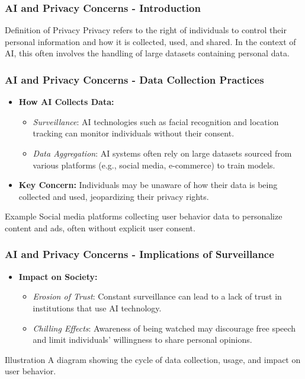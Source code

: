 \documentclass[aspectratio=169]{beamer}
\begin{document}
\begin{frame}[fragile]
    \frametitle{AI and Privacy Concerns - Introduction}
    \begin{block}{Definition of Privacy}
        Privacy refers to the right of individuals to control their personal information and how it is collected, used, and shared. In the context of AI, this often involves the handling of large datasets containing personal data.
    \end{block}
\end{frame}

\begin{frame}[fragile]
    \frametitle{AI and Privacy Concerns - Data Collection Practices}
    \begin{itemize}
        \item \textbf{How AI Collects Data:}
        \begin{itemize}
            \item \textit{Surveillance}: AI technologies such as facial recognition and location tracking can monitor individuals without their consent.
            \item \textit{Data Aggregation}: AI systems often rely on large datasets sourced from various platforms (e.g., social media, e-commerce) to train models.
        \end{itemize}
        \item \textbf{Key Concern:} 
        Individuals may be unaware of how their data is being collected and used, jeopardizing their privacy rights.
    \end{itemize}
    \begin{block}{Example}
        Social media platforms collecting user behavior data to personalize content and ads, often without explicit user consent.
    \end{block}
\end{frame}

\begin{frame}[fragile]
    \frametitle{AI and Privacy Concerns - Implications of Surveillance}
    \begin{itemize}
        \item \textbf{Impact on Society:}
        \begin{itemize}
            \item \textit{Erosion of Trust}: Constant surveillance can lead to a lack of trust in institutions that use AI technology.
            \item \textit{Chilling Effects}: Awareness of being watched may discourage free speech and limit individuals' willingness to share personal opinions.
        \end{itemize}
    \end{itemize}
    \begin{block}{Illustration}
        A diagram showing the cycle of data collection, usage, and impact on user behavior.
    \end{block}
\end{frame}
\end{document}
